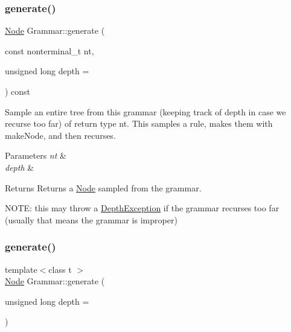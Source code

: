 \mbox{\label{class_grammar_a6a08c44dbbba7406d3638bdc549fddad}} 
\subsubsection{\texorpdfstring{generate()}{generate()}\hspace{0.1cm}{\footnotesize\ttfamily [1/2]}}
{\footnotesize\ttfamily \hyperlink{class_node}{Node} Grammar\+::generate (\begin{DoxyParamCaption}\item[{const nonterminal\+\_\+t}]{nt,  }\item[{unsigned long}]{depth = {} }\end{DoxyParamCaption}) const\hspace{0.3cm}{\ttfamily [inline]}}

Sample an entire tree from this grammar (keeping track of depth in case we recurse too far) of return type nt. This samples a rule, makes them with make\+Node, and then recurses. 
\begin{DoxyParams}{Parameters}
{\em nt} & \\
\hline
{\em depth} & \\
\hline
\end{DoxyParams}
\begin{DoxyReturn}{Returns}
Returns a \hyperlink{class_node}{Node} sampled from the grammar.
\end{DoxyReturn}
N\+O\+TE\+: this may throw a \hyperlink{class_depth_exception}{Depth\+Exception} if the grammar recurses too far (usually that means the grammar is improper)\mbox{\label{class_grammar_aee4cda199ab92f79b55e73f6cbd90c8b}} 
\subsubsection{\texorpdfstring{generate()}{generate()}\hspace{0.1cm}{\footnotesize\ttfamily [2/2]}}
{\footnotesize\ttfamily template$<$class t $>$ \\
\hyperlink{class_node}{Node} Grammar\+::generate (\begin{DoxyParamCaption}\item[{unsigned long}]{depth = {} }\end{DoxyParamCaption})\hspace{0.3cm}{\ttfamily [inline]}}

